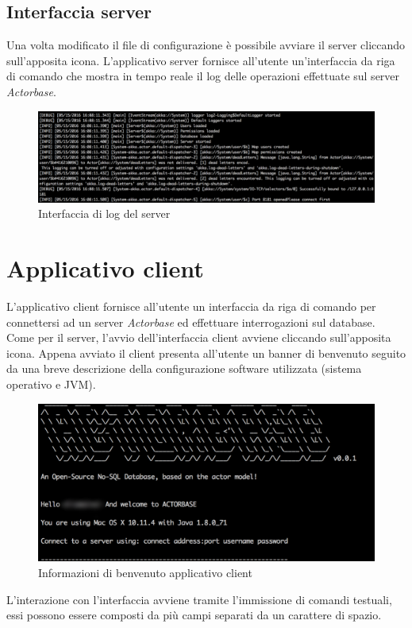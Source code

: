 \documentclass[a4paper]{article}
\begin{document}
	\subsection{Interfaccia server}
	Una volta modificato il file di configurazione è possibile avviare il server cliccando sull'apposita icona. L'applicativo server fornisce all'utente un'interfaccia da riga di comando che mostra in tempo reale il log delle operazioni effettuate sul server \emph{Actorbase}.  
	\begin{figure}[H]
		\centering
		\includegraphics[width=\textwidth]{logServer.png}
		\caption{Interfaccia di log del server}
	\end{figure}
	\newpage
	

	\section{Applicativo client}
	L'applicativo client fornisce all'utente un interfaccia da riga di comando per connettersi ad un server \emph{Actorbase} ed effettuare interrogazioni sul database. Come per il server, l'avvio dell'interfaccia client avviene cliccando sull'apposita icona. Appena avviato il client presenta all'utente un banner di benvenuto seguito da una breve descrizione della configurazione software utilizzata (sistema operativo e JVM).
	\begin{figure}[H]
		\centering
		\includegraphics[width=\textwidth]{welcomeClient.png}
		\caption{Informazioni di benvenuto applicativo client}
	\end{figure}
	L'interazione con l'interfaccia avviene tramite l'immissione di comandi testuali, essi possono essere composti da più campi separati da un carattere di spazio.
	
\end{document}
